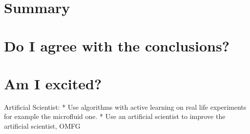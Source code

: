 \documentclass{article}
\begin{document}

\section{Summary} %

\section{Do I agree with the conclusions?}

\section{Am I excited?}

Artificial Scientist: 
* Use algorithms with active learning on real life experiments for example the
microfluid one.
* Use an artificial scientist to improve the artificial scientist, OMFG
\end{document}
